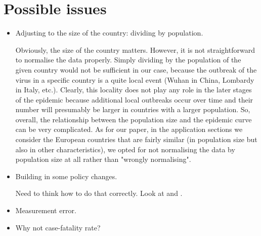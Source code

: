 \documentclass[a4paper,12pt]{article}
\numberwithin{equation}{section}
\begin{document}
{%
%
%



\section{Possible issues}
\begin{itemize}
	\item Adjusting to the size of the country: dividing by population.
	
	Obviously, the size of the country matters. However, it is not straightforward to normalise the data properly. Simply dividing by the population of the given country 
	would not be sufficient in our case, because the outbreak of the virus in a specific country is a quite local event (Wuhan in China, Lombardy in Italy, etc.). Clearly,     	this locality does not play any role in the later stages of the epidemic because additional local outbreaks occur over time and their number will presumably be 		larger in countries with a larger population. So, overall, the relationship between the population size and the epidemic curve can be very complicated. As for our 	paper, in the application sections we consider the European countries that are fairly similar (in population size but also in other characteristics), we opted for not 	normalising the data by population size at all rather than "wrongly normalising".
	\item Building in some policy changes.
	
	Need to think how to do that correctly. Look at \cite{Alfano2020} and \cite{Courtemanche2020}.
	\item Measurement error.
	\item Why not case-fatality rate?
\end{itemize}

}
\end{document}

